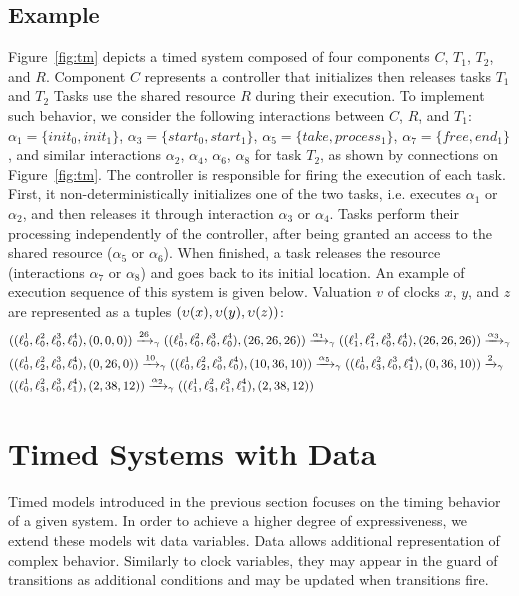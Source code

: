 \subsection{Example}\label{exp:run}

Figure~\ref{fig:tm} depicts a timed system composed of four components $C$, $T_1$, $T_2$, 
and $R$.
Component $C$ represents a  controller that initializes then releases tasks $T_1$ and $T_2$
Tasks use the shared resource $R$ during their execution.
To implement such behavior, we consider the following interactions between $C$, $R$, and 
$T_1$: $\alpha_1=\{init_0, init_1\}$,
$\alpha_3=\{start_0, start_1\}$, $\alpha_5=\{ take, process_1\}$, $\alpha_7 = 
\{free, end_1 \}$, 
and similar interactions $\alpha_2$, $\alpha_4$, $\alpha_6$, $\alpha_8$ for task $T_2$, 
as shown by connections on Figure~\ref{fig:tm}.
The controller is responsible for firing
the execution of each task. First, it non-deterministically initializes one
of the two tasks, i.e. executes $\alpha_1$ or $\alpha_2$, and then
releases it through interaction $\alpha_3$ or $\alpha_4$.
Tasks perform their processing independently of the controller, after being granted an access 
to the shared resource ($\alpha_5$ or $\alpha_6$).
When finished, a task releases the resource (interactions $\alpha_7$ or $\alpha_8$) and goes 
back to its initial location.
An example of execution sequence of this system is given below. Valuation $v$ of clocks $x$, 
$y$, and $z$ are represented as a tuples 
$(\upsilon(x),\upsilon(y),\upsilon(z))$:
\begin{displaymath}
\small{
\begin{split}
&((\ell_0^1,\ell_0^2,\ell_0^3,\ell_0^4),(0,0,0))\xrightarrow{26}_{\gamma}
((\ell_0^1,\ell_0^2,\ell_0^3,\ell_0^4),(26,26,26))\xrightarrow{\alpha_1}_{\gamma}
((\ell_1^1,\ell_1^2,\ell_0^3,\ell_0^4),(26,26,26))\xrightarrow{\alpha_3}_{\gamma}\\
&((\ell_0^1,\ell_2^2,\ell_0^3,\ell_0^4),(0,26,0))\xrightarrow{10}_{\gamma}
((\ell_0^1,\ell_2^2,\ell_0^3,\ell_0^4),(10,36,10))\xrightarrow{\alpha_5}_{\gamma}
((\ell_0^1,\ell_3^2,\ell_0^3,\ell_1^4),(0,36,10))\xrightarrow{2}_{\gamma}\\&
((\ell_0^1,\ell_3^2,\ell_0^3,\ell_1^4),(2,38,12))\xrightarrow{\alpha_2}_{\gamma}
((\ell_1^1,\ell_3^2,\ell_1^3,\ell_1^4),(2,38,12))
\end{split}
}
\end{displaymath}

\section{Timed Systems with Data}
Timed models introduced in the previous section focuses on the timing behavior of a given system.
In order to achieve a higher degree of expressiveness, we extend these models wit data variables.
Data allows additional representation of complex behavior. Similarly to clock variables, they may
appear in the guard of transitions as additional conditions and may be updated when transitions
fire.

